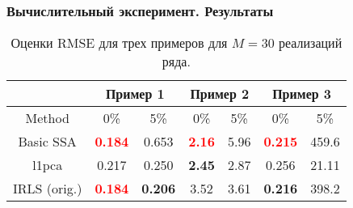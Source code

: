 \documentclass[10pt, ucs, notheorems, handout]{beamer}
\begin{document}
\begin{frame}
\frametitle{Вычислительный эксперимент. Результаты}
\small{
\begin{table}
\caption{Оценки RMSE для трех примеров для $M=30$ реализаций ряда.}
\label{tab_all}
\centering
\begin{tabular}{|c||c|c||c|c||c|c|}
\hline
&\multicolumn{2}{|c||}{Пример 1}& \multicolumn{2}{|c||}{Пример 2}&\multicolumn{2}{|c|}{Пример 3} \\
\hline
Method 	& 0\% & 5\% & 0\% & 5\% & 0\% & 5\% \\ 
\hline
Basic SSA & \textbf{\textcolor{red}{0.184}} & 0.653  & \textbf{\textcolor{red}{2.16}}  & 5.96 & \textbf{\textcolor{red}{0.215}} & 459.6 \\
l1pca & 0.217 & 0.250  & \textbf{\alert{2.45}} & 2.87 & 0.256 & 21.11\\
IRLS (orig.) & \textbf{\textcolor{red}{0.184}} & \textbf{\alert{0.206}}  & 3.52  & 3.61 & \textbf{\alert{0.216}} & 398.2 \\

\end{tabular}
\end{table}}
\end{frame}
\end{document}
